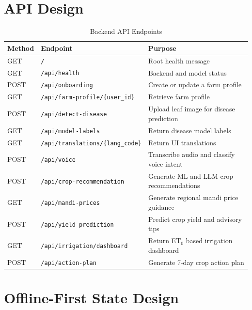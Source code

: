 \documentclass[12pt,a4paper]{report}
\begin{document}
\section{API Design}

\begin{table}[H]
\centering
\caption{Backend API Endpoints}
\label{tab:api}
\footnotesize
\begin{tabular}{p{1.8cm}p{4.2cm}p{7.2cm}}
\toprule
\textbf{Method} & \textbf{Endpoint} & \textbf{Purpose} \\
\midrule
GET & \texttt{/} & Root health message \\
GET & \texttt{/api/health} & Backend and model status \\
POST & \texttt{/api/onboarding} & Create or update a farm profile \\
GET & \texttt{/api/farm-profile/}\newline\texttt{\{user\_id\}} & Retrieve farm profile \\
POST & \texttt{/api/detect-disease} & Upload leaf image for disease prediction \\
GET & \texttt{/api/model-labels} & Return disease model labels \\
GET & \texttt{/api/translations/}\newline\texttt{\{lang\_code\}} & Return UI translations \\
POST & \texttt{/api/voice} & Transcribe audio and classify voice intent \\
POST & \texttt{/api/}\newline\texttt{crop-recommendation} & Generate ML and LLM crop recommendations \\
GET & \texttt{/api/mandi-prices} & Generate regional mandi price guidance \\
POST & \texttt{/api/yield-prediction} & Predict crop yield and advisory tips \\
GET & \texttt{/api/irrigation/}\newline\texttt{dashboard} & Return ET$_0$ based irrigation dashboard \\
POST & \texttt{/api/action-plan} & Generate 7-day crop action plan \\
\bottomrule
\end{tabular}
\end{table}

\section{Offline-First State Design}
\end{document}
